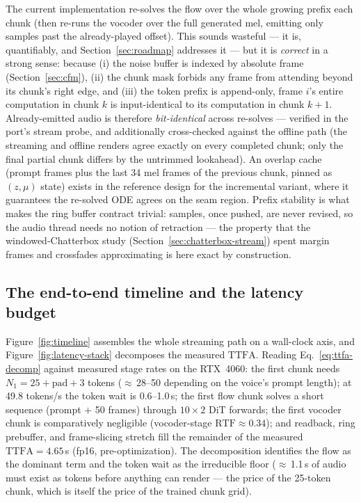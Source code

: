 \documentclass[11pt,a4paper]{article}
\newcommand{\RTF}{\ensuremath{\mathrm{RTF}}}
\newcommand{\TTFA}{\ensuremath{\mathrm{TTFA}}}
\begin{document}
The current implementation re-solves the flow over the whole growing prefix each chunk
(then re-runs the vocoder over the full generated mel, emitting only samples past the
already-played offset). This sounds wasteful --- it is, quantifiably, and
Section~\ref{sec:roadmap} addresses it --- but it is \emph{correct} in a strong sense:
because (i) the noise buffer is indexed by absolute frame (Section~\ref{sec:cfm}),
(ii) the chunk mask forbids any frame from attending beyond its chunk's right edge, and
(iii) the token prefix is append-only, frame $i$'s entire computation in chunk $k$ is
input-identical to its computation in chunk $k{+}1$. Already-emitted audio is therefore
\emph{bit-identical} across re-solves --- verified in the port's stream probe, and
additionally cross-checked against the offline path (the streaming and offline renders
agree exactly on every completed chunk; only the final partial chunk differs by the
untrimmed lookahead). An overlap cache (prompt frames plus the last 34 mel frames of
the previous chunk, pinned as $(z, \mu)$ state) exists in the reference design for the
incremental variant, where it guarantees the re-solved ODE agrees on the seam region.
Prefix stability is what makes the ring buffer contract trivial: samples, once pushed,
are never revised, so the audio thread needs no notion of retraction --- the property
that the windowed-Chatterbox study (Section~\ref{sec:chatterbox-stream}) spent margin
frames and crossfades approximating is here exact by construction.

\subsection{The end-to-end timeline and the latency budget}
\label{sec:timeline}

Figure~\ref{fig:timeline} assembles the whole streaming path on a wall-clock axis, and
Figure~\ref{fig:latency-stack} decomposes the measured \TTFA{}. Reading
Eq.~\eqref{eq:ttfa-decomp} against measured stage rates on the RTX~4060: the first
chunk needs $N_1 = 25 + \mathrm{pad} + 3$ tokens ($\approx$\,28--50 depending on the
voice's prompt length); at 49.8 tokens/s the token wait is 0.6--1.0\,s; the first flow
chunk solves a short sequence (prompt $+$ 50 frames) through $10\times2$ DiT forwards;
the first vocoder chunk is comparatively negligible (vocoder-stage $\RTF \approx
0.34$); and readback, ring prebuffer, and frame-slicing stretch fill the remainder of
the measured $\TTFA = 4.65$\,s (fp16, pre-optimization). The decomposition identifies
the flow as the dominant term and the token wait as the irreducible floor
($\approx$\,1.1\,s of audio must exist as tokens before anything can render --- the
price of the 25-token chunk, which is itself the price of the trained chunk grid).
\end{document}
